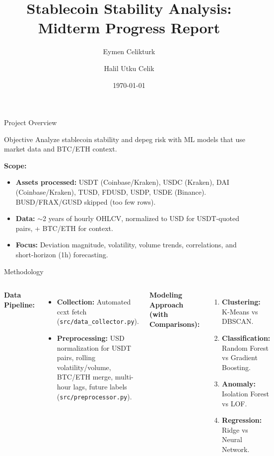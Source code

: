 \documentclass[aspectratio=169]{beamer}
\title[Stablecoin Stability Analysis]{Stablecoin Stability Analysis: \\ Midterm Progress Report}
\author{Eymen Celikturk\and Halil Utku Celik}
\institute{Introduction to Data Analysis and Visualization}
\date{\today}
\begin{document}
\begin{frame}
\titlepage
\end{frame}

\begin{frame}{Project Overview}
\begin{block}{Objective}
Analyze stablecoin stability and depeg risk with ML models that use market data and BTC/ETH context.
\end{block}

\vspace{0.5cm}

\textbf{Scope:}
\begin{itemize}
    \item \textbf{Assets processed:} USDT (Coinbase/Kraken), USDC (Kraken), DAI (Coinbase/Kraken), TUSD, FDUSD, USDP, USDE (Binance). BUSD/FRAX/GUSD skipped (too few rows).
    \item \textbf{Data:} \(\sim\)2 years of hourly OHLCV, normalized to USD for USDT-quoted pairs, + BTC/ETH for context.
    \item \textbf{Focus:} Deviation magnitude, volatility, volume trends, correlations, and short-horizon (1h) forecasting.
\end{itemize}
\end{frame}

\begin{frame}{Methodology}
\begin{columns}[t]
\textbf{Data Pipeline:}
\begin{itemize}
    \item \textbf{Collection:} Automated ccxt fetch (\texttt{src/data\_collector.py}).
    \item \textbf{Preprocessing:} USD normalization for USDT pairs, rolling volatility/volume, BTC/ETH merge, multi-hour lags, future labels (\texttt{src/preprocessor.py}).
\end{itemize}

\textbf{Modeling Approach (with Comparisons):}
\begin{enumerate}
    \item \textbf{Clustering:} K-Means vs DBSCAN.
    \item \textbf{Classification:} Random Forest vs Gradient Boosting.
    \item \textbf{Anomaly:} Isolation Forest vs LOF.
    \item \textbf{Regression:} Ridge vs Neural Network.
\end{enumerate}
\end{columns}
\end{frame}
\end{document}

